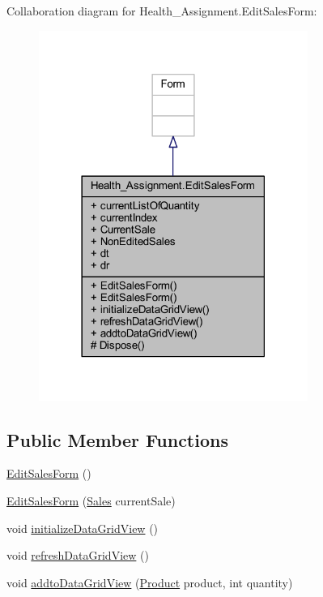 Collaboration diagram for Health\+\_\+\+Assignment.\+Edit\+Sales\+Form\+:\nopagebreak
\begin{figure}[H]
\begin{center}
\leavevmode
\includegraphics[width=249pt]{class_health___assignment_1_1_edit_sales_form__coll__graph}
\end{center}
\end{figure}
\subsection*{Public Member Functions}
\begin{DoxyCompactItemize}
\item 
\hyperlink{class_health___assignment_1_1_edit_sales_form_aa93c9c912a266975431d178d827de70a}{Edit\+Sales\+Form} ()
\item 
\hyperlink{class_health___assignment_1_1_edit_sales_form_a2f1911cf4675da610870f2053c2c3b01}{Edit\+Sales\+Form} (\hyperlink{class_health___assignment_1_1_sales}{Sales} current\+Sale)
\item 
void \hyperlink{class_health___assignment_1_1_edit_sales_form_af95e8755eff244b07f6680f14cdfcbd7}{initialize\+Data\+Grid\+View} ()
\item 
void \hyperlink{class_health___assignment_1_1_edit_sales_form_a2ea1ad203f275ddbce0289aa04f830bb}{refresh\+Data\+Grid\+View} ()
\item 
void \hyperlink{class_health___assignment_1_1_edit_sales_form_a2b34cf118075dae5a75ccc15598675b4}{addto\+Data\+Grid\+View} (\hyperlink{class_health___assignment_1_1_product}{Product} product, int quantity)
\end{DoxyCompactItemize}
